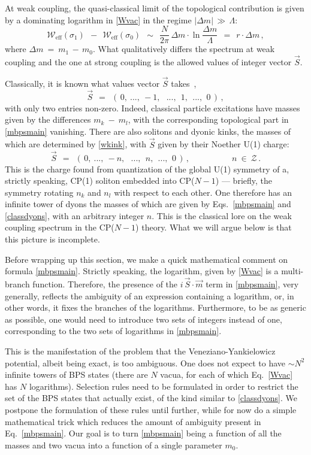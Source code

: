 \documentclass[epsfig,12pt]{article}
\def\beq{\begin{equation}}
\def\eeq{\end{equation}}
\def\beq{\begin{equation}}
\def\eeq{\end{equation}}
\newcommand{\mc}[1]{\mathcal{#1}}
\newcommand{\W}{\mathcal{W}}
\begin{document}
	At weak coupling, the quasi-classical limit of the topological contribution is given by
	a dominating logarithm in \eqref{Wvac} in the regime $ | \Delta m | \,\gg\, \Lambda $:
\beq
\label{wkink}
	\W_\text{eff} ( \sigma_1 ) ~~-~~ \W_\text{eff} ( \sigma_0 ) ~~\sim~~
		\frac{N}{2\pi}\,
		\Delta m \cdot \ln \frac{\Delta m}{\Lambda} ~~=~~  r \cdot \Delta m\,, 
\eeq
	where $ \Delta m ~=~ m_1 \,-\, m_0 $.
 	What qualitatively differs the spectrum at weak coupling and the one at strong coupling is the allowed values of
	integer vector $ \vec{S} $.

	Classically, it is known what values vector $ \vec{S} $ takes \cite{Dor}\,,
\beq
	\vec{S} ~~=~~ (\, 0,~ ...,~ -1, ~~~...,~~ 1,~~ ...,~\, 0\, )\,,
\eeq
	with only two entries non-zero.
	Indeed, classical particle excitations have masses given by the differences $ m_k ~-~ m_l $, with the
	corresponding topological part in \eqref{mbpsmain} vanishing.
	There are also solitons and dyonic kinks, the masses of which are determined by \eqref{wkink}, 
	with $ \vec{S} $ given by their Noether U(1) charge:
\beq
\label{classdyons}
	\vec{S} ~~=~~ (\, 0,~ ...,~ -n, ~~~...,~~ n,~~ ...,~\, 0\, )\,, 
	\qquad\qquad\quad     n~\in~\mc{Z}\,.
\eeq
	This is the charge found from quantization of the global U(1) symmetry of a, strictly speaking, CP(1) soliton
	embedded into CP($N-1$) --- briefly, the symmetry rotating $ n_k $ and $ n_l $ with respect to each other.
	One therefore has an infinite tower of dyons the masses of which are given by 
	Eqs.~\eqref{mbpsmain} and \eqref{classdyons}, with an arbitrary integer $ n $.
	This is the classical lore on the weak coupling spectrum in the CP($N-1$) theory.
	What we will argue below is that this picture is incomplete. 

\vspace{0.8cm}
	Before wrapping up this section, we make a quick mathematical comment on formula \eqref{mbpsmain}. 
	Strictly speaking, the logarithm, given by \eqref{Wvac} is a multi-branch function. 
	Therefore, the presence of the $ i\, \vec{S} \cdot \vec{m} $ term in \eqref{mbpsmain}, very
	generally, reflects the ambiguity of an expression containing a logarithm, or, 
	in other words, it fixes the branches of the logarithms. 
	Furthermore, to be as generic as possible, one would need to introduce two sets of integers 
	instead of one, corresponding to the two sets of logarithms in \eqref{mbpsmain}.
	
	This is the manifestation of the problem that the Veneziano-Yankielowicz potential, albeit being exact,
	is too ambiguous.
	One does not expect to have $ \sim N^2 $ infinite towers of BPS states 
	(there are $N$ vacua, for each of which Eq.~\eqref{Wvac} has $ N $ logarithms).
	Selection rules need to be formulated in order to restrict the set of the BPS states
	that actually exist, of the kind similar to \eqref{classdyons}. 
	We postpone the formulation of these rules until further, while for now do a simple mathematical
	trick which reduces the amount of ambiguity present in Eq.~\eqref{mbpsmain}.
	Our goal is to turn \eqref{mbpsmain} being a function of all the masses and two vacua into a function
	of a single parameter $ m_0 $.
	
\end{document}
